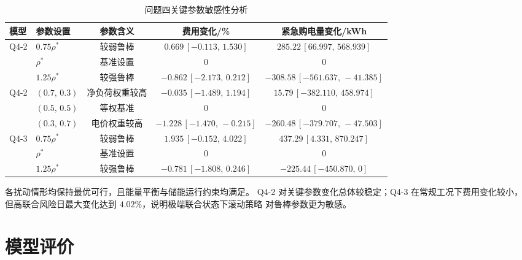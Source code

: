 \documentclass[zihao=-4,a4paper,UTF8,fontset=none]{ctexart}
\begin{document}
\begin{table}[H]
    \centering
    \caption{问题四关键参数敏感性分析}
    \label{tab:q4_sensitivity}
    \small
    \setlength{\tabcolsep}{5pt}
    \renewcommand{\arraystretch}{1.15}
    \begin{tabular}{llccc}
        \toprule
        模型 & 参数设置 & 参数含义 & 费用变化/\% & 紧急购电量变化/kWh \\
        \midrule

        \multirow{3}{*}{Q4-2}
        & $0.75\rho^*$ & 较弱鲁棒
        & $0.669\,[-0.113,\,1.530]$
        & $285.22\,[66.997,\,568.939]$ \\

        & $\rho^*$ & 基准设置
        & $0$
        & $0$ \\

        & $1.25\rho^*$ & 较强鲁棒
        & $-0.862\,[-2.173,\,0.212]$
        & $-308.58\,[-561.637,\,-41.385]$ \\
        \midrule

        \multirow{3}{*}{Q4-2}
        & $(0.7,\,0.3)$ & 净负荷权重较高
        & $-0.035\,[-1.489,\,1.194]$
        & $15.79\,[-382.110,\,458.974]$ \\

        & $(0.5,\,0.5)$ & 等权基准
        & $0$
        & $0$ \\

        & $(0.3,\,0.7)$ & 电价权重较高
        & $-1.228\,[-1.470,\,-0.215]$
        & $-260.48\,[-379.707,\,-47.503]$ \\
        \midrule

        \multirow{3}{*}{Q4-3}
        & $0.75\rho^*$ & 较弱鲁棒
        & $1.935\,[-0.152,\,4.022]$
        & $437.29\,[4.331,\,870.247]$ \\

        & $\rho^*$ & 基准设置
        & $0$
        & $0$ \\

        & $1.25\rho^*$ & 较强鲁棒
        & $-0.781\,[-1.808,\,0.246]$
        & $-225.44\,[-450.870,\,0]$ \\

        \bottomrule
    \end{tabular}
\end{table}
各扰动情形均保持最优可行，且能量平衡与储能运行约束均满足。
Q4-2 对关键参数变化总体较稳定；Q4-3 在常规工况下费用变化较小，
但高联合风险日最大变化达到 $4.02\%$，说明极端联合状态下滚动策略
对鲁棒参数更为敏感。

\section{模型评价}
\end{document}
